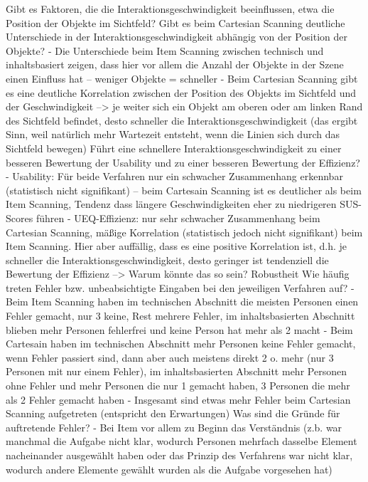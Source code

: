 Gibt es Faktoren, die die Interaktionsgeschwindigkeit beeinflussen, etwa die Position der Objekte im Sichtfeld? Gibt es beim Cartesian Scanning deutliche Unterschiede in der Interaktionsgeschwindigkeit abhängig von der Position der Objekte?
-	Die Unterschiede beim Item Scanning zwischen technisch und inhaltsbasiert zeigen, dass hier vor allem die Anzahl der Objekte in der Szene einen Einfluss hat – weniger Objekte = schneller 
-	Beim Cartesian Scanning gibt es eine deutliche Korrelation zwischen der Position des Objekts im Sichtfeld und der Geschwindigkeit --> je weiter sich ein Objekt am oberen oder am linken Rand des Sichtfeld befindet, desto schneller die Interaktionsgeschwindigkeit (das ergibt Sinn, weil natürlich mehr Wartezeit entsteht, wenn die Linien sich durch das Sichtfeld bewegen) 
Führt eine schnellere Interaktionsgeschwindigkeit zu einer besseren Bewertung der Usability und zu einer besseren Bewertung der Effizienz? 
-	Usability: Für beide Verfahren nur ein schwacher Zusammenhang erkennbar (statistisch nicht signifikant) – beim Cartesain Scanning ist es deutlicher als beim Item Scanning, Tendenz dass längere Geschwindigkeiten eher zu niedrigeren SUS-Scores führen 
-	UEQ-Effizienz: nur sehr schwacher Zusammenhang beim Cartesian Scanning, mäßige Korrelation (statistisch jedoch nicht signifikant) beim Item Scanning. Hier aber auffällig, dass es eine positive Korrelation ist, d.h. je schneller die Interaktionsgeschwindigkeit, desto geringer ist tendenziell die Bewertung der Effizienz --> Warum könnte das so sein?
Robustheit
Wie häufig treten Fehler bzw. unbeabsichtigte Eingaben bei den jeweiligen Verfahren auf? 
-	Beim Item Scanning haben im technischen Abschnitt die meisten Personen einen Fehler gemacht, nur 3 keine, Rest mehrere Fehler, im inhaltsbasierten Abschnitt blieben mehr Personen fehlerfrei und keine Person hat mehr als 2 macht 
-	Beim Cartesain haben im technischen Abschnitt mehr Personen keine Fehler gemacht, wenn Fehler passiert sind, dann aber auch meistens direkt 2 o. mehr (nur 3 Personen mit nur einem Fehler), im inhaltsbasierten Abschnitt mehr Personen ohne Fehler und mehr Personen die nur 1 gemacht haben, 3 Personen die mehr als 2 Fehler gemacht haben 
-	Insgesamt sind etwas mehr Fehler beim Cartesian Scanning aufgetreten (entspricht den Erwartungen) 
Was sind die Gründe für auftretende Fehler?
-	Bei Item vor allem zu Beginn das Verständnis (z.b. war manchmal die Aufgabe nicht klar, wodurch Personen mehrfach dasselbe Element nacheinander ausgewählt haben oder das Prinzip des Verfahrens war nicht klar, wodurch andere Elemente gewählt wurden als die Aufgabe vorgesehen hat) 
